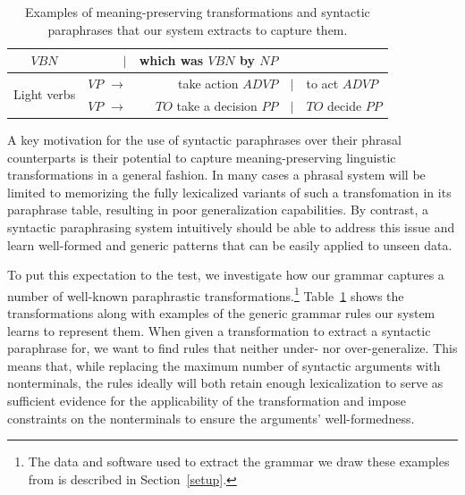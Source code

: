 \documentclass[11pt]{article}
\begin{document}
\begin{table}[!ht]
\begin{center}
\begin{tabular}{|c|rrcl|}
    $\mathit{VBN}$ & $\mid$ & which was $\mathit{VBN}$ by $\mathit{NP}$ \\
    \hline
    \multirow{2}{*}{Light verbs} & $\mathit{VP}$ $\rightarrow$ & take action $\mathit{ADVP}$ &
    $\mid$ & to act $\mathit{ADVP}$ \\
    & $\mathit{VP}$ $\rightarrow$ & $\mathit{TO}$ take a decision $\mathit{PP}$ &
    $\mid$ & $\mathit{TO}$ decide $\mathit{PP}$ \\
    \hline
\end{tabular}
\normalsize
\end{center}
\caption{Examples of meaning-preserving transformations and syntactic
  paraphrases that our system extracts to capture them.}
\label{example_rules}
\end{table}


A key motivation for the use of syntactic paraphrases over their
phrasal counterparts is their potential to capture meaning-preserving
linguistic transformations in a general fashion. In many cases a
phrasal system will be limited to memorizing the fully lexicalized
variants of such a transfomation in its paraphrase table, resulting in
poor generalization capabilities. By contrast, a syntactic
paraphrasing system intuitively should be able to address this issue
and learn well-formed and generic patterns that can be easily applied
to unseen data.

To put this expectation to the test, we investigate how our grammar
captures a number of well-known paraphrastic
transformations.\footnote{The data and software used to extract the
  grammar we draw these examples from is described in
  Section~\ref{setup}.} Table~\ref{example_rules} shows the
transformations along with examples of the generic grammar rules our
system learns to represent them. When given a transformation to
extract a syntactic paraphrase for, we want to find rules that neither
under- nor over-generalize. This means that, while replacing the
maximum number of syntactic arguments with nonterminals, the rules
ideally will both retain enough lexicalization to serve as sufficient
evidence for the applicability of the transformation and impose
constraints on the nonterminals to ensure the arguments'
well-formedness.
\end{document}
